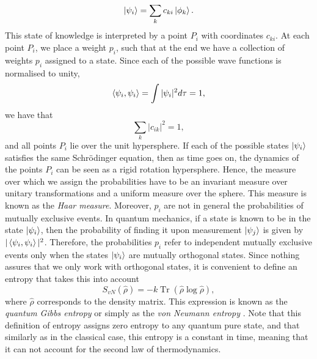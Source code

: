 \begin{equation}
\mathinner{|{\psi_{i}}\rangle} = \sum_{k}c_{ki}\mathinner{|{\phi_k}\rangle}.
\end{equation}
This state of knowledge is interpreted by a point $P_i$ with coordinates $c_{ki}$. At each point $P_i$, we place a weight $p_i$, such that at the end we have a collection of weights $p_i$ assigned to a state. Since each of the possible wave functions is normalised to unity,
\begin{equation}
\mathinner{\langle{\psi_{i},\psi_{i}}\rangle} = \int |\psi_i|^2 d\tau =1, 
\end{equation}
we have that 
\begin{equation}
\sum_k |c_{ik}|^2= 1,
\end{equation}
and all points $P_i$ lie over the unit hypersphere. If each of the possible states $\mathinner{|{\psi_i}\rangle}$ satisfies the same Schr\"odinger equation, then as time goes on, the dynamics of the points $P_i$ can be seen as a rigid rotation hypersphere. Hence, the measure over which we assign the probabilities have to be an invariant measure over unitary transformations and a uniform measure over the sphere. This measure is known as the \textit{Haar measure}. Moreover, $p_i$ are not in general the probabilities of mutually exclusive events. In quantum mechanics, if a state is known to be in the 	state $\mathinner{|{\psi_i}\rangle}$, then the probability of finding it upon measurement $\mathinner{|{\psi_j}\rangle}$ is given by $|\mathinner{\langle{\psi_{i},\psi_{i}}\rangle}|^2$. Therefore, the probabilities $p_i$ refer to independent mutually exclusive events only when the states $\mathinner{|{\psi_i}\rangle}$ are mutually orthogonal states. Since nothing assures that we only work with orthogonal states, it is convenient to define an entropy that takes this into account
\begin{equation}
S_{vN}(\hat{\rho}) = -k\operatorname{Tr}(\hat{\rho}\log \hat{\rho}),
\end{equation}
where $\hat{\rho}$ corresponds to the density matrix. This expression is known as the \textit{quantum Gibbs entropy} or simply  as the \textit{von Neumann entropy} \cite{von_neumann_mathematical_1955}. Note that this definition of entropy assigns zero entropy to any quantum pure state, and that similarly as in the classical case, this entropy is a constant in time, meaning that it can not account for the second law of thermodynamics.\\	
